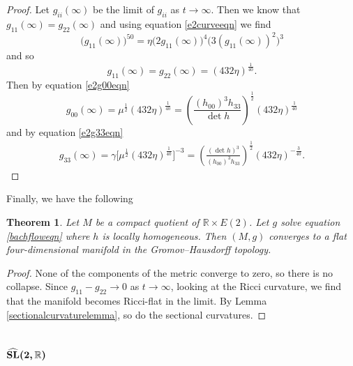 \documentclass[pdftex]{sigma}
\numberwithin{equation}{section}
\newtheorem{Theorem}{Theorem}[section]
\begin{document}
\begin{proof}
Let $g_{ii}(\infty)$ be the limit of $g_{ii}$ as $t \rightarrow \infty$. Then we know that $g_{11}(\infty) = g_{22}(\infty)$ and using equation \eqref{e2curveeqn} we find
\[
\bigl(g_{11}(\infty)\bigr)^{50} = \eta \bigl(2g_{11}(\infty)\bigr)^4 \bigl(3 (g_{11}(\infty))^2 \bigr)^3
\]
and so
\[
g_{11}(\infty) = g_{22}(\infty) = (432 \eta)^{\frac{1}{40}}.
\]
Then by equation \eqref{e2g00eqn}
\[
g_{00}(\infty) = \mu^{\frac{1}{2}} (432 \eta)^{\frac{1}{40}}
			= \left(\frac{(h_{00})^3 h_{33}}{\det h} \right)^{\frac{1}{2}} (432 \eta)^{\frac{1}{40}}
\]
and by equation \eqref{e2g33eqn}
\begin{gather*}
g_{33}(\infty) = \gamma \bigl[\mu^{\frac{1}{2}} (432 \eta)^{\frac{1}{40}}\bigr]^{-3}
			= \left( \frac{(\det h)^{3}}{(h_{00})^{3} h_{33}} \right)^{\frac{1}{2}} (432 \eta)^{-\frac{3}{40}}.\tag*{\qed}
\end{gather*} \renewcommand{\qed}{}
\end{proof}

Finally, we have the following

\begin{Theorem}
Let $M$ be a compact quotient of $\mathbb{R} \times E(2)$. Let $g$ solve equation \eqref{bachfloweqn} where $h$ is locally homogeneous. Then $(M, g)$ converges to a flat four-dimensional manifold in the Gromov--Hausdorff topology.
\end{Theorem}


\begin{proof}
None of the components of the metric converge to zero, so there is no collapse. Since $g_{11} - g_{22} \rightarrow 0$ as $t \rightarrow \infty$, looking at the Ricci curvature, we find that the manifold becomes Ricci-flat in the limit. By Lemma \ref{sectionalcurvaturelemma}, so do the sectional curvatures.
\end{proof}

\subsection[$\widehat{{\rm SL}}(2,\mathbb{R})$]{$\boldsymbol{\widehat{{\rm SL}}(2,\mathbb{R})}$} \label{sl2rsection}
\end{document}
